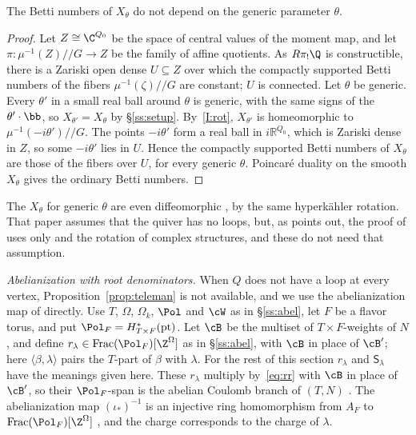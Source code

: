 \documentclass[11pt]{amsart}
\begin{document}
\begin{lemma}\label{lem:betti}
The Betti numbers of $X_\theta$ do not depend on the generic parameter
$\theta$.
\end{lemma}

\begin{proof}
Let $Z\cong\C^{Q_0}$ be the space of central values of the moment map, and
let $\pi\colon\mu^{-1}(Z)/\!/G\to Z$ be the family of affine quotients.  As
$R\pi_!\Q$ is constructible, there is a Zariski open dense
$U\subseteq Z$ over which the compactly supported Betti numbers of the fibers
$\mu^{-1}(\zeta)/\!/G$ are constant; $U$ is connected.  Let $\theta$ be
generic.  Every $\theta'$ in a small real ball around $\theta$ is generic,
with the same signs of the $\theta'\cdot\bb$, so $X_{\theta'}=X_\theta$ by
\S\ref{ss:setup}.  By~\ref{I:rot}, $X_{\theta'}$ is homeomorphic to
$\mu^{-1}(-i\theta')/\!/G$.  The points $-i\theta'$ form a real ball in
$i\mathbb R^{Q_0}$, which is Zariski dense in $Z$, so some $-i\theta'$ lies in
$U$.  Hence the compactly supported Betti numbers of $X_\theta$ are those of
the fibers over $U$, for every generic $\theta$.  Poincar\'e duality on the
smooth $X_\theta$ gives the ordinary Betti numbers.
\end{proof}

The $X_\theta$ for generic $\theta$ are even diffeomorphic
\cite[Cor.~4.2]{nakajimaInstantonsALE1994}, by the same hyperk\"ahler rotation.  That paper
assumes that the quiver has no loops, but, as \cite[Rem.~3.3]{nakajimaMultipartitionSpaces2026} points out, the proof of
\cite[Cor.~4.2]{nakajimaInstantonsALE1994} uses only
\cite[Thm.~4.1(1),(2)]{nakajimaInstantonsALE1994} and the rotation of complex
structures, and these do not need that assumption.

\emph{Abelianization with root denominators.}  When $Q$ does not have a loop
at every vertex, Proposition~\ref{prop:teleman} is not available, and we use
the abelianization map of \cite{BFN} directly.  Use $T$, $\Omega$,
$\Omega_k$, $\Pol$ and $\cW$ as in \S\ref{ss:abel}, let $F$ be a flavor
torus, and put $\Pol_F=H^*_{T\times F}(\mathrm{pt})$.  Let $\cB$ be the
multiset of $T\times F$-weights of $N$, and define
$r_\lambda\in\mathrm{Frac}(\Pol_F)[\Z^\Omega]$ as in \S\ref{ss:abel}, with $\cB$
in place of $\cB'$; here $\langle\beta,\lambda\rangle$ pairs the $T$-part of
$\beta$ with $\lambda$.  For the rest of this section $r_\lambda$ and $\mathsf
S_\lambda$ have the meanings given here.  These $r_\lambda$ multiply by~\eqref{eq:rr} with $\cB$
in place of $\cB'$, so their $\Pol_F$-span is the abelian Coulomb branch of
$(T,N)$ \cite[Thm.~4.1]{BFN}.  The abelianization map $(\iota_*)^{-1}$ is an
injective ring homomorphism from $A_F$ to $\mathrm{Frac}(\Pol_F)[\Z^\Omega]$
\cite[Lemma~5.17]{BFN}, and the charge corresponds to the charge of
$\lambda$.
\end{document}
